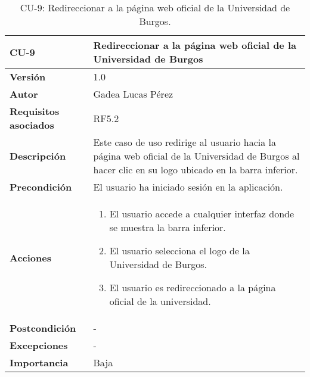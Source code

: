 \begin{table}[p]
\centering
\begin{tabularx}{\linewidth}{ p{} p{} }
\toprule
\textbf{CU-9} & \textbf{Redireccionar a la página web oficial de la Universidad de Burgos}\\
\toprule
\textbf{Versión} & 1.0 \\
\textbf{Autor} & Gadea Lucas Pérez \\
\textbf{Requisitos asociados} & RF5.2 \\
\textbf{Descripción} & Este caso de uso redirige al usuario hacia la página web oficial de la Universidad de Burgos al hacer clic en su logo ubicado en la barra inferior.\\
\textbf{Precondición} & El usuario ha iniciado sesión en la aplicación.\\
\textbf{Acciones} &
\begin{enumerate}
\def\labelenumi{\arabic{enumi}.}
\tightlist
\item El usuario accede a cualquier interfaz donde se muestra la barra inferior.
\item El usuario selecciona el logo de la Universidad de Burgos.
\item El usuario es redireccionado a la página oficial de la universidad.
\end{enumerate}\\ 
\textbf{Postcondición} & - \\
\textbf{Excepciones} & - \\
\textbf{Importancia} & Baja \\
\bottomrule
\end{tabularx}
\caption{CU-9: Redireccionar a la página web oficial de la Universidad de Burgos.}
\label{tab:cu9}
\end{table}


